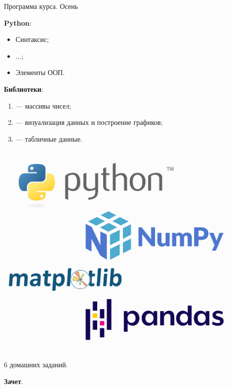 \documentclass[russian, unicode, xcolor={dvipsnames}, aspectratio=43]{beamer}
\begin{document}
\begin{frame}{Программа курса. Осень}
	
	\begin{minipage}{0.49\textwidth}
		\textbf{Python}:
		\begin{itemize}
			\item Синтаксис;
			\item $\ldots$;
			\item Элементы ООП.  
		\end{itemize}
			
		\textbf{Библиотеки}:
		\begin{enumerate}
			\item {} --- массивы чисел;
			\item {} --- визуализация данных и построение графиков;
			\item {} --- табличные данные. 
		\end{enumerate}
			

		
	\end{minipage}
	\begin{minipage}{0.49\textwidth}
		
		\includegraphics[width=0.9\textwidth]{pictures/autumn_logos.png}
		
		\begin{tcolorbox}[colback=green!5,colframe=green!75!black,title=Аттестация]
		6 домашних заданий.
		
		\textbf{Зачет}.	
		\end{tcolorbox}
		
		
	\end{minipage}
\end{frame}
\end{document}
